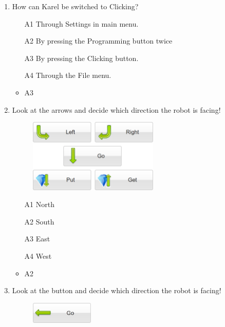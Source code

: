 \documentclass[article,A4,12pt]{llncs}
\begin{document}
\begin{enumerate}
\item How can Karel be switched to Clicking?
\begin{enumerate}
\item[A1] Through Settings in main menu.
\item[A2] By pressing the Programming button twice
\item[A3] By pressing the Clicking button.
\item[A4] Through the File menu.
\end{enumerate}
  \begin{itemize}
    \item A3
  \end{itemize}
\item Look at the arrows and decide which direction the robot is facing!
\newpage
\begin{figure}[!ht]
\begin{center}
\includegraphics[width=6.2cm]{imgk/buttons-all-3.png}
\end{center}
\end{figure}
\begin{enumerate}
\item[A1] North
\item[A2] South
\item[A3] East
\item[A4] West
\end{enumerate}  
  \begin{itemize}
    \item A2
  \end{itemize}
\item Look at the button and decide which direction the robot is facing!
\begin{figure}[!ht]
\begin{center}
\includegraphics[width=3cm]{imgk/button-go-3.png}
\end{center}
\end{figure}
\begin{enumerate}

\end{enumerate}
\end{enumerate}
\end{document}
